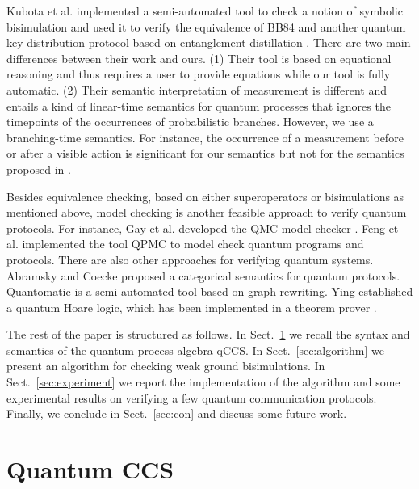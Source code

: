 \documentclass[a4paper,runningheads]{llncs}
\begin{document}
Kubota et al. \cite{KKKKS16}  implemented a semi-automated tool to check a notion of symbolic bisimulation and  used it to verify the equivalence of BB84  and another quantum key distribution protocol based on entanglement distillation \cite{SP00}. There are two main differences between their work and ours. (1) Their tool is based on equational reasoning and thus requires a user to provide equations while our tool is fully automatic. (2) Their semantic interpretation of measurement is different and entails a kind of linear-time semantics for quantum processes that ignores the timepoints of the occurrences of probabilistic branches. However, we use a branching-time semantics. For instance, the occurrence of a measurement before or after a visible action is significant for our semantics but not for the semantics proposed in \cite{KKKKS16}.

Besides equivalence checking, based on either superoperators or bisimulations as mentioned above, model checking is another feasible approach to verify quantum protocols. For instance, Gay et al. developed the QMC model checker \cite{GNP08}.
Feng et al. implemented  the tool QPMC \cite{FHTZ15} to model check quantum programs and protocols. There are also other approaches for verifying quantum systems. Abramsky and Coecke \cite{AC04} proposed a categorical semantics for quantum protocols. Quantomatic \cite{Kis11} is a semi-automated tool based on graph rewriting. Ying \cite{Yin16} established a quantum Hoare logic, which has been implemented in a theorem prover \cite{LLWYZ16}.

The rest of the paper is structured as follows. %
In Sect.~\ref{sec:qccs} we recall the syntax and semantics of the quantum process algebra qCCS. In Sect.~\ref{sec:algorithm} we present an algorithm for checking weak ground bisimulations. In Sect.~\ref{sec:experiment} we report the implementation of the algorithm and some experimental results on verifying a few quantum communication protocols. Finally, we conclude in Sect.~\ref{sec:con} and discuss some future work.


\section{Quantum CCS}\label{sec:qccs}
\end{document}
